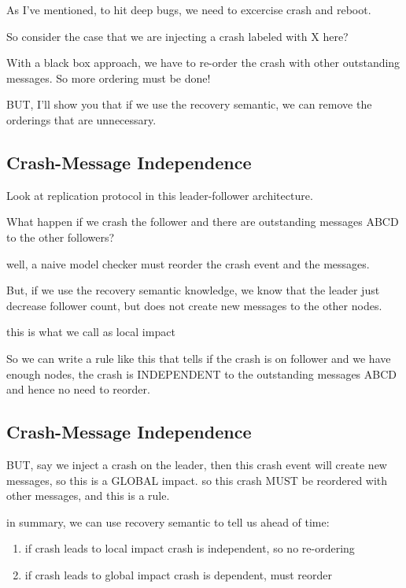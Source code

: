 As I've mentioned, to hit deep bugs, we need to excercise crash and reboot.

So consider the case that we are injecting a crash labeled with X here?

With a black box approach, we have to re-order the crash with other outstanding
messages. So more ordering must be done!

BUT, I'll show you that if we use the recovery semantic, we can remove the
orderings that are unnecessary.

\subsection{Crash-Message Independence}

Look at replication protocol in this leader-follower architecture.

What happen if we crash the follower and there are outstanding messages ABCD to
the other followers?

well, a naive model checker must reorder the crash event and the messages.

But, if we use the recovery semantic knowledge, we know that the leader just
decrease follower count, but does not create new messages to the other nodes.

this is what we call as local impact

So we can write a rule like this that tells if the crash is on follower and we
have enough nodes, the crash is INDEPENDENT to the outstanding messages ABCD and
hence no need to reorder.

\subsection{Crash-Message Independence}

BUT, say we inject a crash on the leader, then this crash event will create new
messages, so this is a GLOBAL impact. so this crash MUST be reordered with other
messages, and this is a rule.

in summary, we can use recovery semantic to tell us ahead of time:

\begin{enumerate}
\item if crash leads to local impact crash is independent, so no re-ordering
\item if crash leads to global impact crash is dependent, must reorder
\end{enumerate}

